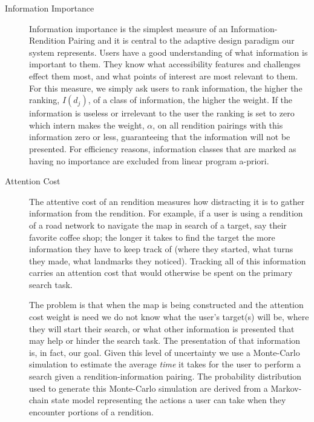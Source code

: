 \begin{description}
\item[Information Importance]
Information importance is the simplest measure of an Information-Rendition Pairing and it is central to the adaptive design paradigm our system represents. Users have a good understanding of what information is important to them. They know what accessibility features and challenges effect them most, and what points of interest are most relevant to them. For this measure, we simply ask users to rank information, the higher the ranking, $I(d_j)$, of a class of information, the higher the weight. If the information is useless or irrelevant to the user the ranking is set to zero which intern makes the weight, $\alpha$, on all rendition pairings with this information zero or less, guaranteeing that the information will not be presented. For efficiency reasons, information classes that are marked as having no importance are excluded from linear program a-priori. 

\item[Attention Cost]
The attentive cost of an rendition measures how distracting it is to gather information from the rendition. For example, if a user is using a rendition of a road network to navigate the map in search of a target, say their favorite coffee shop;  the longer it takes to find the target the more information they have to keep track of (\eg where they started, what turns they made, what landmarks they noticed). Tracking all of this information carries an attention cost that would otherwise be spent on the primary search task.

The problem is that when the map is being constructed and the attention cost weight is need we do not know what the user's target(s) will be, where they will start their search, or what other information is presented that may help or hinder the search task. The presentation of that information is, in fact, our goal. Given this level of uncertainty we use a Monte-Carlo simulation to estimate the average \textit{time} it takes for the user to perform a search given a rendition-information pairing. The probability distribution used to generate this Monte-Carlo simulation are derived from a Markov-chain state model representing the actions a user can take when they encounter portions of a rendition. 
\begin{figure}
\label{fig::exampleStates}
\end{figure}
\end{description}
